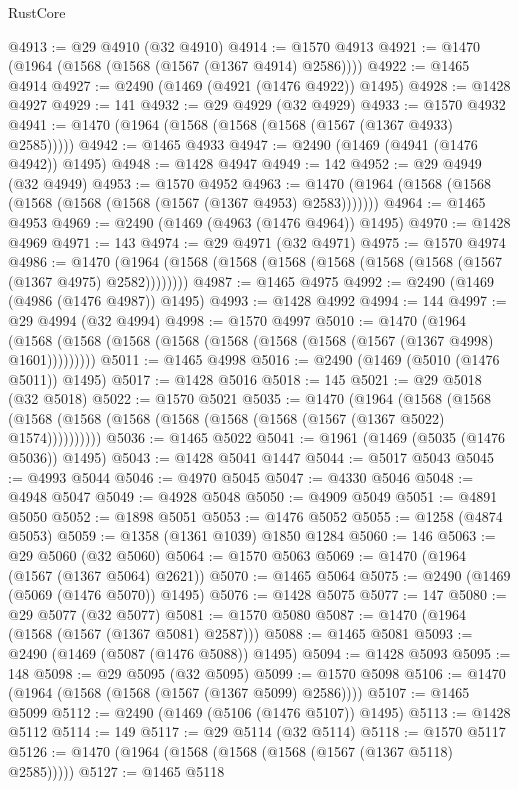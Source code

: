 \begin{lexlean}{RustCore}
\begin{coremodule}
@4913 := @29 @4910 (@32 @4910)
@4914 := @1570 @4913
@4921 := @1470 (@1964 (@1568 (@1568 (@1567 (@1367 @4914) @2586))))
@4922 := @1465 @4914
@4927 := @2490 (@1469 (@4921 (@1476 @4922)) @1495)
@4928 := @1428 @4927
@4929 := 141
@4932 := @29 @4929 (@32 @4929)
@4933 := @1570 @4932
@4941 := @1470 (@1964 (@1568 (@1568 (@1568 (@1567 (@1367 @4933) @2585)))))
@4942 := @1465 @4933
@4947 := @2490 (@1469 (@4941 (@1476 @4942)) @1495)
@4948 := @1428 @4947
@4949 := 142
@4952 := @29 @4949 (@32 @4949)
@4953 := @1570 @4952
@4963 := @1470 (@1964 (@1568 (@1568 (@1568 (@1568 (@1568 (@1567 (@1367 @4953) @2583)))))))
@4964 := @1465 @4953
@4969 := @2490 (@1469 (@4963 (@1476 @4964)) @1495)
@4970 := @1428 @4969
@4971 := 143
@4974 := @29 @4971 (@32 @4971)
@4975 := @1570 @4974
@4986 := @1470 (@1964 (@1568 (@1568 (@1568 (@1568 (@1568 (@1568 (@1567 (@1367 @4975) @2582))))))))
@4987 := @1465 @4975
@4992 := @2490 (@1469 (@4986 (@1476 @4987)) @1495)
@4993 := @1428 @4992
@4994 := 144
@4997 := @29 @4994 (@32 @4994)
@4998 := @1570 @4997
@5010 := @1470
    (@1964 (@1568 (@1568 (@1568 (@1568 (@1568 (@1568 (@1568 (@1567 (@1367 @4998) @1601)))))))))
@5011 := @1465 @4998
@5016 := @2490 (@1469 (@5010 (@1476 @5011)) @1495)
@5017 := @1428 @5016
@5018 := 145
@5021 := @29 @5018 (@32 @5018)
@5022 := @1570 @5021
@5035 := @1470
    (@1964
      (@1568 (@1568 (@1568 (@1568 (@1568 (@1568 (@1568 (@1568 (@1567 (@1367 @5022) @1574))))))))))
@5036 := @1465 @5022
@5041 := @1961 (@1469 (@5035 (@1476 @5036)) @1495)
@5043 := @1428 @5041 @1447
@5044 := @5017 @5043
@5045 := @4993 @5044
@5046 := @4970 @5045
@5047 := @4330 @5046
@5048 := @4948 @5047
@5049 := @4928 @5048
@5050 := @4909 @5049
@5051 := @4891 @5050
@5052 := @1898 @5051
@5053 := @1476 @5052
@5055 := @1258 (@4874 @5053)
@5059 := @1358 (@1361 @1039) @1850 @1284
@5060 := 146
@5063 := @29 @5060 (@32 @5060)
@5064 := @1570 @5063
@5069 := @1470 (@1964 (@1567 (@1367 @5064) @2621))
@5070 := @1465 @5064
@5075 := @2490 (@1469 (@5069 (@1476 @5070)) @1495)
@5076 := @1428 @5075
@5077 := 147
@5080 := @29 @5077 (@32 @5077)
@5081 := @1570 @5080
@5087 := @1470 (@1964 (@1568 (@1567 (@1367 @5081) @2587)))
@5088 := @1465 @5081
@5093 := @2490 (@1469 (@5087 (@1476 @5088)) @1495)
@5094 := @1428 @5093
@5095 := 148
@5098 := @29 @5095 (@32 @5095)
@5099 := @1570 @5098
@5106 := @1470 (@1964 (@1568 (@1568 (@1567 (@1367 @5099) @2586))))
@5107 := @1465 @5099
@5112 := @2490 (@1469 (@5106 (@1476 @5107)) @1495)
@5113 := @1428 @5112
@5114 := 149
@5117 := @29 @5114 (@32 @5114)
@5118 := @1570 @5117
@5126 := @1470 (@1964 (@1568 (@1568 (@1568 (@1567 (@1367 @5118) @2585)))))
@5127 := @1465 @5118

\end{coremodule}
\end{lexlean}
